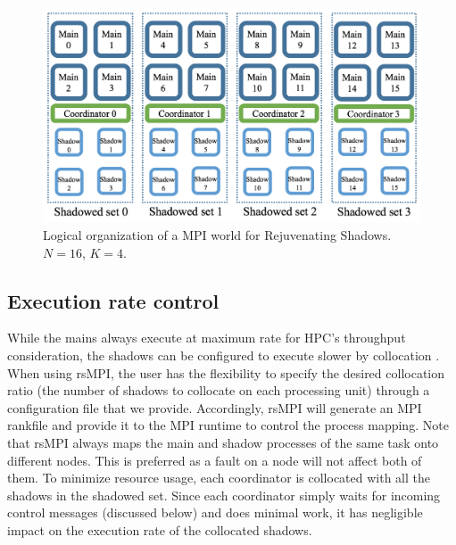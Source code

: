 \begin{figure}[!t]
  \begin{center}
      \includegraphics[width=\columnwidth]{figures/logical_org}
  \end{center}
  \caption{Logical organization of a MPI world for Rejuvenating Shadows. $N=16$, $K=4$.}
  \label{fig:logical_org}
\end{figure}

\subsection{Execution rate control}
While the mains always execute at maximum rate for HPC's throughput consideration, the shadows can be configured to execute slower by collocation \cite{cui_2016_scalcom}. 
When using rsMPI, the user has the flexibility to specify the desired collocation ratio (the number of shadows to collocate on each processing unit) through a configuration file that we provide. Accordingly, rsMPI will generate an MPI rankfile and provide it to the MPI runtime to control the process mapping. Note that rsMPI always maps the main and shadow processes of the same task onto different nodes. This is preferred as a fault on a node will not affect both of them. 
To minimize resource usage, each coordinator is collocated with all the shadows in the shadowed set. Since each coordinator simply waits for incoming control messages (discussed below) and does minimal work, it has negligible impact on the execution rate of the collocated shadows. 


